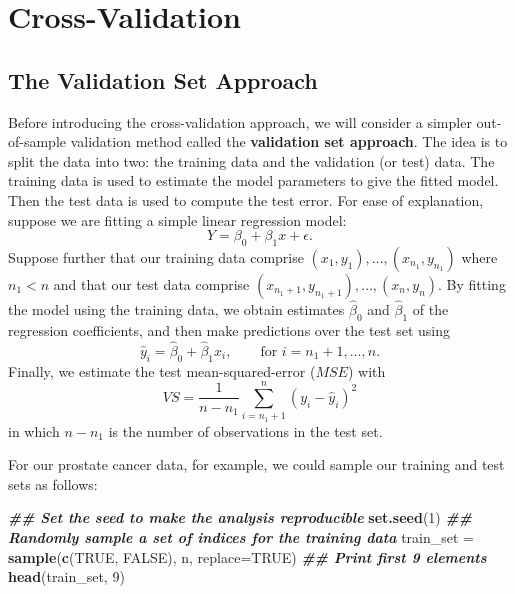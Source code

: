 \documentclass[
]{article}
\newenvironment{Shaded}{\begin{snugshade}}{\end{snugshade}}
\newcommand{\AttributeTok}[1]{\textcolor[rgb]{0.13,0.29,0.53}{#1}}
\newcommand{\ConstantTok}[1]{\textcolor[rgb]{0.56,0.35,0.01}{#1}}
\newcommand{\DecValTok}[1]{\textcolor[rgb]{0.00,0.00,0.81}{#1}}
\newcommand{\DocumentationTok}[1]{\textcolor[rgb]{0.56,0.35,0.01}{\textbf{\textit{#1}}}}
\newcommand{\FunctionTok}[1]{\textcolor[rgb]{0.13,0.29,0.53}{\textbf{#1}}}
\newcommand{\NormalTok}[1]{#1}
\newcommand{\OtherTok}[1]{\textcolor[rgb]{0.56,0.35,0.01}{#1}}
\begin{document}
\hypertarget{sec:crossvalidation}{%
\section{Cross-Validation}\label{sec:crossvalidation}}

\hypertarget{the-validation-set-approach}{%
\subsection{The Validation Set
Approach}\label{the-validation-set-approach}}

Before introducing the cross-validation approach, we will consider a
simpler out-of-sample validation method called the \textbf{validation
set approach}. The idea is to split the data into two: the training data
and the validation (or test) data. The training data is used to estimate
the model parameters to give the fitted model. Then the test data is
used to compute the test error. For ease of explanation, suppose we are
fitting a simple linear regression model: \begin{equation*}
Y = \beta_0 +  \beta_1 x + \epsilon.
\end{equation*} Suppose further that our training data comprise
\((x_1, y_1), \ldots, (x_{n_1}, y_{n_1})\) where \(n_1 < n\) and that
our test data comprise \((x_{n_1+1}, y_{n_1+1}), \ldots, (x_n, y_{n})\).
By fitting the model using the training data, we obtain estimates
\(\hat{\beta}_0\) and \(\hat{\beta}_1\) of the regression coefficients,
and then make predictions over the test set using \begin{equation*}
\hat{y}_i = \hat{\beta}_0 +  \hat{\beta}_1 x_{i}, \qquad \text{for $i=n_1+1,\ldots,n$.}
\end{equation*} Finally, we estimate the test mean-squared-error
(\(MSE\)) with \begin{equation*}
VS = \frac{1}{n-n_1} \sum_{i=n_1+1}^n (y_i - \hat{y}_i)^2
\end{equation*} in which \(n-n_1\) is the number of observations in the
test set.

For our prostate cancer data, for example, we could sample our training
and test sets as follows:

\begin{Shaded}
\begin{Highlighting}[]
\DocumentationTok{\#\# Set the seed to make the analysis reproducible}
\FunctionTok{set.seed}\NormalTok{(}\DecValTok{1}\NormalTok{)}
\DocumentationTok{\#\# Randomly sample a set of indices for the training data}
\NormalTok{train\_set }\OtherTok{=} \FunctionTok{sample}\NormalTok{(}\FunctionTok{c}\NormalTok{(}\ConstantTok{TRUE}\NormalTok{, }\ConstantTok{FALSE}\NormalTok{), n, }\AttributeTok{replace=}\ConstantTok{TRUE}\NormalTok{)}
\DocumentationTok{\#\# Print first 9 elements}
\FunctionTok{head}\NormalTok{(train\_set, }\DecValTok{9}\NormalTok{)}
\end{Highlighting}
\end{Shaded}
\end{document}

